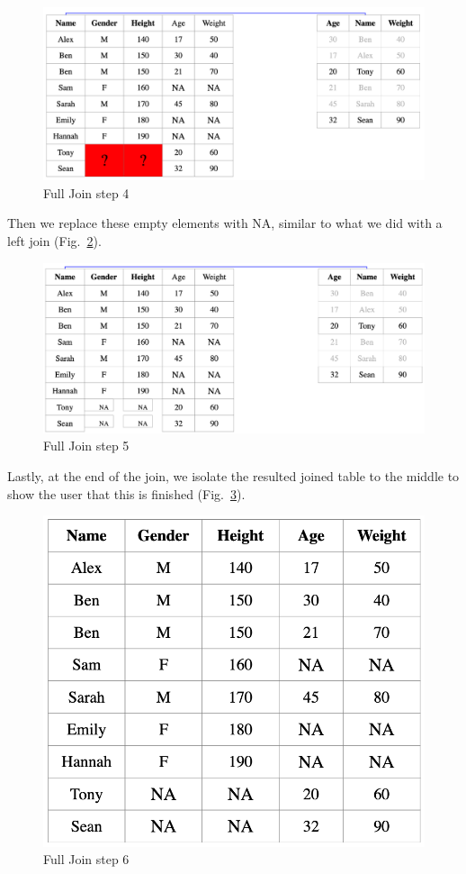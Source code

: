 \begin{figure}[H]
    \includegraphics[scale = 0.25]{Masters-Thesis/img/full4.png}
    \caption{Full Join step 4}
    \label{fig:full4}
\end{figure}

Then we replace these empty elements with NA, similar to what we did with a left join (Fig.~\ref{fig:full5}). 

\begin{figure}[H]
    \includegraphics[scale = 0.25]{Masters-Thesis/img/full5.png}
    \caption{Full Join step 5}
    \label{fig:full5}
\end{figure}

\newpage

Lastly, at the end of the join, we isolate the resulted joined table to the middle to show the user that this is finished (Fig.~\ref{fig:full6}).

\begin{figure}[H]
    \centering
    \includegraphics[scale = 0.3]{Masters-Thesis/img/full6.png}
    \caption{Full Join step 6}
    \label{fig:full6}
\end{figure}

